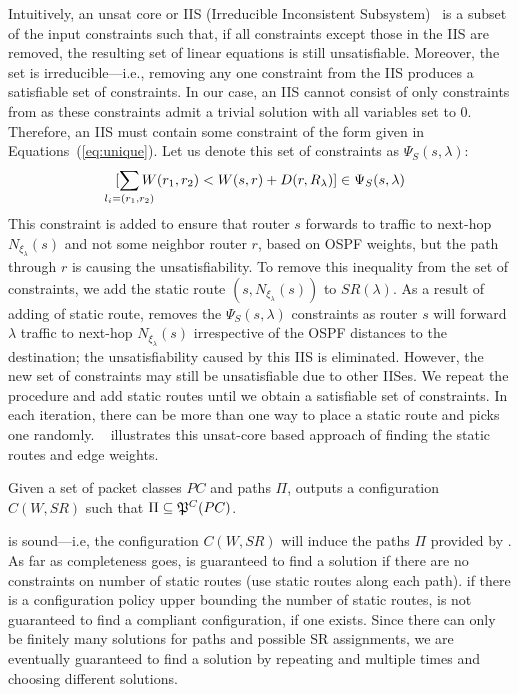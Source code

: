 Intuitively, an unsat core or IIS (Irreducible Inconsistent Subsystem)~\cite{chinneck2007feasibility} 
is a subset of the input constraints such that,
if all constraints except those in the IIS are removed, the resulting set of
linear equations is still unsatisfiable. 
Moreover, the set is irreducible---i.e., removing 
any one constraint from the IIS produces a satisfiable set of constraints. 
In our case, an IIS cannot consist of only 
constraints from  as these constraints
admit a trivial solution with all variables set to 0. 
Therefore, an IIS must contain some constraint of the form
given in Equations~(\ref{eq:unique}). Let us denote 
this set of constraints as $\Psi_S(s, \lambda)$:
\[
[\sum_{\mathclap{\substack{l_i=(r_1,r_2)}}} 
W(r_1, r_2) < W(s, r) + D(r, R_\lambda) ] \in \Psi_S(s, \lambda)
\]	
This constraint is added to ensure 
that router $s$ forwards to traffic to next-hop
$N_{\xi_\lambda}(s)$ and not some neighbor router 
$r$, based on OSPF weights,
but the path through $r$ is causing the unsatisfiability. 
To remove this inequality from the set of constraints, 
we add the static route $(s,N_{\xi_\lambda}(s))$ to $SR(\lambda)$.
As a result of adding of static route, \name removes 
the $\Psi_S(s, \lambda)$ constraints as router $s$ 
will forward $\lambda$ traffic  to 
next-hop $N_{\xi_\lambda}(s)$ irrespective of
the OSPF distances to the destination; the 
unsatisfiability caused by this IIS is eliminated. 
However, the new set of
constraints may still be unsatisfiable due to other IISes.
We repeat the procedure and add static routes
until we obtain a satisfiable set of
constraints. 
In each iteration, there can be more than one way to place a static route and
\name picks one randomly. ~ illustrates
this unsat-core based approach of finding the static routes and edge weights.

\iffull
\begin{theorem} \label{thm:ospfsr}
	Given a set of packet classes $PC$ and paths $\Pi$,  outputs
	a configuration $C(W,SR)$ such that $\Pi\subseteq\mathfrak{P}^C(PC)$.
\end{theorem}

\fi

 is sound---i.e, the configuration $C(W,SR)$ 
will induce the paths $\Pi$ provided by \genesis. As far as
completeness goes, \name is guaranteed to find a solution if
there are no constraints on number of static routes (use
static routes along each path). if there is a configuration policy 
upper bounding the number of static routes,  is not guaranteed 
to find a compliant configuration, if one exists. 
Since there can only be finitely many 
solutions for paths and possible SR assignments, we are eventually guaranteed 
to find a solution by repeating \genesis and
 multiple times and choosing different
solutions.


